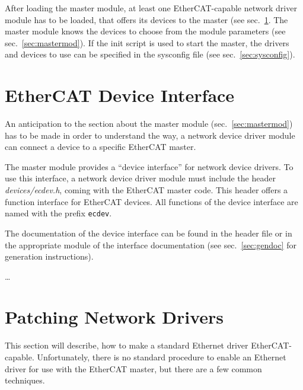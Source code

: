 \documentclass[a4paper,12pt,BCOR6mm,bibtotoc,idxtotoc]{scrbook}
\begin{document}
After loading the master module, at least one EtherCAT-capable network driver
module has to be loaded, that offers its devices to the master (see
sec.~\ref{sec:ecdev}. The master module knows the devices to choose from the
module parameters (see sec.~\ref{sec:mastermod}). If the init script is used
to start the master, the drivers and devices to use can be specified in the
sysconfig file (see sec.~\ref{sec:sysconfig}).


\section{EtherCAT Device Interface}
\label{sec:ecdev}

An anticipation to the section about the master module
(sec.~\ref{sec:mastermod}) has to be made in order to understand the way, a
network device driver module can connect a device to a specific EtherCAT
master.

The master module provides a ``device interface'' for network device drivers.
To use this interface, a network device driver module must include the header
\textit{devices/ecdev.h}, coming with the
EtherCAT master code. This header offers a function interface for EtherCAT
devices. All functions of the device interface are named with the prefix
\lstinline+ecdev+.

The documentation of the device interface can be found in the header file or
in the appropriate module of the interface documentation (see
sec.~\ref{sec:gendoc} for generation instructions).

\ldots %


\section{Patching Network Drivers}
\label{sec:patching}

This section will describe, how to make a standard Ethernet driver
EtherCAT-capable. Unfortunately, there is no standard procedure to enable an
Ethernet driver for use with the EtherCAT master, but there are a few common
techniques.
\end{document}
